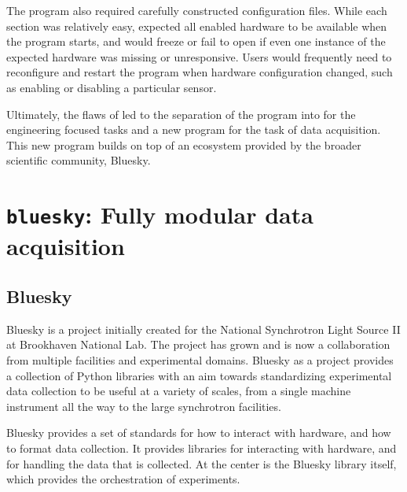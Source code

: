 The program also required carefully constructed configuration files.
While each section was relatively easy, \yaqccmds{} expected all enabled hardware to be available when the program starts, and would freeze or fail to open if even one instance of the expected hardware was missing or unresponsive.
Users would frequently need to reconfigure and restart the program when hardware configuration changed, such as enabling or disabling a particular sensor.

Ultimately, the flaws of \yaqccmds{} led to the separation of the program into \yaqcqtpy{} for the engineering focused tasks and a new program for the task of data acquisition.
This new program builds on top of an ecosystem provided by the broader scientific community, Bluesky\cite{AllanDanielB2019a}.

\clearpage

\section{\texttt{bluesky}: Fully modular data acquisition}

\subsection{Bluesky}


Bluesky is a project initially created for the National Synchrotron Light Source II at Brookhaven National Lab.
The project has grown and is now a collaboration from multiple facilities and experimental domains.
Bluesky as a project provides a collection of Python libraries with an aim towards standardizing experimental data collection to be useful at a variety of scales, from a single machine instrument all the way to the large synchrotron facilities.

Bluesky provides a set of standards for how to interact with hardware, and how to format data collection.
It provides libraries for interacting with hardware, and for handling the data that is collected.
At the center is the Bluesky library itself, which provides the orchestration of experiments.


